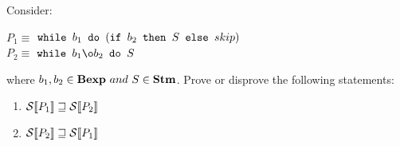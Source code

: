 \newcommand{\exEightA}
{$ \wbS{b_1}{(\ifABC{b_2}{S}{skip})} $}

\newcommand{\exEightB}
{$  \wbS{b_1 \o b_2}{S} $}

{
		Consider: 
	\begin{center}
$ P_1 \equiv $ \exEightA \\
$ P_2 \equiv $ \exEightB
	\end{center}
where $ b_1, b_2 \in\mbox{\textbf{Bexp}}~and~S\in\mbox{\textbf{Stm}}$. Prove or disprove the following statements: 
\begin{enumerate}
	\item $ \mathcal{S} \llbracket P_1 \rrbracket  \sqsupseteq  \mathcal{S} \llbracket P_2  \rrbracket   $
	\item $  \mathcal{S} \llbracket P_2 \rrbracket  \sqsupseteq  \mathcal{S} \llbracket P_1 \rrbracket   $
\end{enumerate}
}
{

}
\newpage